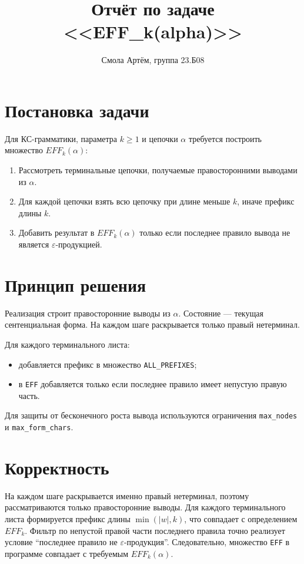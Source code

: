 \documentclass[12pt,a4paper]{article}
\title{Отчёт по задаче <<EFF\_k(alpha)>>}
\author{Смола Артём, группа 23.Б08}
\date{}
\begin{document}
\maketitle

\section{Постановка задачи}
Для КС-грамматики, параметра $k \ge 1$ и цепочки $\alpha$ требуется построить множество $EFF_k(\alpha)$:
\begin{enumerate}
    \item Рассмотреть терминальные цепочки, получаемые правосторонними выводами из $\alpha$.
    \item Для каждой цепочки взять всю цепочку при длине меньше $k$, иначе префикс длины $k$.
    \item Добавить результат в $EFF_k(\alpha)$ только если последнее правило вывода не является $\varepsilon$-продукцией.
\end{enumerate}

\section{Принцип решения}
Реализация строит правосторонние выводы из $\alpha$.
Состояние --- текущая сентенциальная форма.
На каждом шаге раскрывается только правый нетерминал.

Для каждого терминального листа:
\begin{itemize}
    \item добавляется префикс в множество \texttt{ALL\_PREFIXES};
    \item в \texttt{EFF} добавляется только если последнее правило имеет непустую правую часть.
\end{itemize}

Для защиты от бесконечного роста вывода используются ограничения
\texttt{max\_nodes} и \texttt{max\_form\_chars}.

\section{Корректность}
На каждом шаге раскрывается именно правый нетерминал, поэтому рассматриваются только правосторонние выводы.
Для каждого терминального листа формируется префикс длины $\min(|w|, k)$, что совпадает с определением $EFF_k$.
Фильтр по непустой правой части последнего правила точно реализует условие
``последнее правило не $\varepsilon$-продукция''.
Следовательно, множество \texttt{EFF} в программе совпадает с требуемым $EFF_k(\alpha)$.
\end{document}
